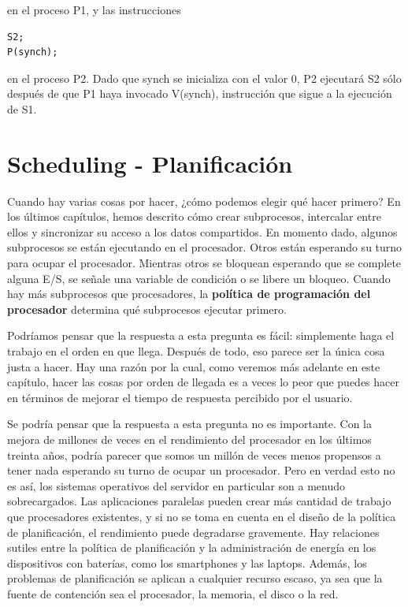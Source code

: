 \documentclass[10pt]{book}
\begin{document}
en el proceso {\mf P1}, y las instrucciones

\begin{lstlisting}
S2;
P(synch);
\end{lstlisting}

en el proceso {\mf P2}. Dado que {\mf synch} se inicializa con el valor 0, {\mf P2} ejecutará {\mf S2} sólo después de que {\mf P1} haya invocado {\mf V(synch)}, instrucción que sigue a la ejecución de {\mf S1}.

\setcounter{chapter}{6}
\chapter{Scheduling - Planificación}
Cuando hay varias cosas por hacer, ¿cómo podemos elegir qué hacer primero? En los últimos capítulos, hemos descrito cómo crear subprocesos, intercalar entre ellos y sincronizar su acceso a los datos compartidos. En momento dado, algunos subprocesos se están ejecutando en el procesador. Otros están esperando su turno para ocupar el procesador. Mientras otros se bloquean esperando que se complete alguna E/S, se señale una variable de condición o se libere un bloqueo. Cuando hay más subprocesos que procesadores, la \textbf{política de programación del procesador} determina qué subprocesos ejecutar primero.

Podríamos pensar que la respuesta a esta pregunta es fácil: simplemente haga el trabajo en el orden en que llega. Después de todo, eso parece ser la única cosa justa a hacer. Hay una razón por la cual, como veremos más adelante en este capítulo, hacer las cosas por orden de llegada es a veces lo peor que puedes hacer en términos de mejorar el tiempo de respuesta percibido por el usuario.

Se podría pensar que la respuesta a esta pregunta no es importante. Con la mejora de millones de veces en el rendimiento del procesador en los últimos treinta años, podría parecer que somos un millón de veces menos propensos a tener nada esperando su turno de ocupar un procesador. Pero en verdad esto no es así, los sistemas operativos del servidor en particular son a menudo sobrecargados. Las aplicaciones paralelas pueden crear más cantidad de trabajo que procesadores existentes, y si no se toma en cuenta en el diseño de la política de planificación, el rendimiento puede degradarse gravemente. Hay relaciones sutiles entre la política de planificación y la administración de energía en los dispositivos con baterías, como los smartphones y las laptops. Además, los problemas de planificación se aplican a cualquier recurso escaso, ya sea que la fuente de contención sea el procesador, la memoria, el disco o la red.
\end{document}
